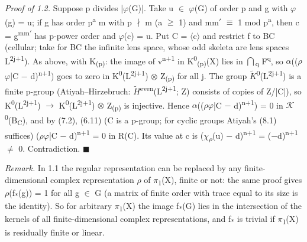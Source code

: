 \emph{Proof of 1.2.} Suppose p divides |\ensuremath{\varphi}(G)|. Take u \ensuremath{\in} \ensuremath{\varphi}(G) of order p and g with \ensuremath{\varphi}(g) = u; if g has order p\textsuperscript{a} m with p \ensuremath{\nmid} m (a \ensuremath{\geq} 1) and mm\ensuremath{\prime} \ensuremath{\equiv} 1 mod p\textsuperscript{a}, then c = g\textsuperscript{mm\ensuremath{\prime}} has p-power order and \ensuremath{\varphi}(c) = u. Put C = \ensuremath{\langle}c\ensuremath{\rangle} and restrict f to BC (cellular; take for BC the infinite lens space, whose odd skeleta are lens spaces L\textsuperscript{2j+1}). As above, with K\textsubscript{(p)}: the image of v\textsuperscript{n+1} in K\textsuperscript{0}\textsubscript{(p)}(X) lies in \ensuremath{\bigcap}\textsubscript{q} F\textsuperscript{q}, so \ensuremath{\alpha}((\ensuremath{\rho}\ensuremath{\varphi}|C \ensuremath{-} d)\textsuperscript{n+1}) goes to zero in K\textsuperscript{0}(L\textsuperscript{2j+1}) \ensuremath{\otimes} Z\textsubscript{(p)} for all j. The group \ensuremath{\widetilde{K}}\textsuperscript{0}(L\textsuperscript{2j+1}) is a finite p-group (Atiyah--Hirzebruch: \ensuremath{\widetilde{H}}\textsuperscript{even}(L\textsuperscript{2j+1}; Z) consists of copies of Z/|C|), so K\textsuperscript{0}(L\textsuperscript{2j+1}) \ensuremath{\to} K\textsuperscript{0}(L\textsuperscript{2j+1}) \ensuremath{\otimes} Z\textsubscript{(p)} is injective. Hence \ensuremath{\alpha}((\ensuremath{\rho}\ensuremath{\varphi}|C \ensuremath{-} d)\textsuperscript{n+1}) = 0 in \ensuremath{\mathcal K}\textsuperscript{0}(B\textsubscript{C}), and by (7.2), (6.11) (C is a p-group; for cyclic groups Atiyah's (8.1) suffices) (\ensuremath{\rho}\ensuremath{\varphi}|C \ensuremath{-} d)\textsuperscript{n+1} = 0 in R(C). Its value at c is (\ensuremath{\chi}\textsubscript{\ensuremath{\rho}}(u) \ensuremath{-} d)\textsuperscript{n+1} = (\ensuremath{-}d)\textsuperscript{n+1} \ensuremath{\ne} 0. Contradiction. \ensuremath{\blacksquare}

\emph{Remark.} In 1.1 the regular representation can be replaced by any finite-dimensional complex representation \ensuremath{\rho} of \ensuremath{\pi}\textsubscript{1}(X), finite or not: the same proof gives \ensuremath{\rho}(f\textsubscript{*}(g)) = 1 for all g \ensuremath{\in} G (a matrix of finite order with trace equal to its size is the identity). So for arbitrary \ensuremath{\pi}\textsubscript{1}(X) the image f\textsubscript{*}(G) lies in the intersection of the kernels of all finite-dimensional complex representations, and f\textsubscript{*} is trivial if \ensuremath{\pi}\textsubscript{1}(X) is residually finite or linear.


